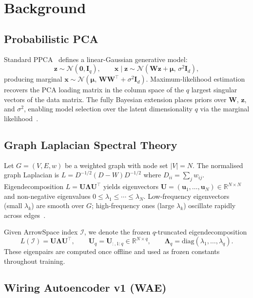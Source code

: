 \documentclass[11pt,a4paper]{article}
\newcommand{\R}{\mathbb{R}}
\newcommand{\N}{\mathcal{N}}
\newcommand{\I}{\mathcal{I}}
\newcommand{\diag}{\mathrm{diag}}
\newcommand{\bLambda}{\bm{\Lambda}}
\newcommand{\bU}{\bm{U}}
\newcommand{\bW}{\bm{W}}
\newcommand{\bz}{\bm{z}}
\newcommand{\bmu}{\bm{\mu}}
\newcommand{\bx}{\bm{x}}
\begin{document}
\section{Background}
\label{sec:background}

\subsection{Probabilistic PCA}

Standard PPCA~\citep{tipping1999ppca} defines a linear-Gaussian generative model:
\begin{equation}
  \bz \sim \N(\mathbf{0}, \bm{I}_q), \qquad
  \bx \mid \bz \sim \N(\bW\bz + \bmu,\, \sigma^2 \bm{I}_d),
  \label{eq:ppca}
\end{equation}
producing marginal $\bx\sim\N(\bmu,\,\bW\bW^\top+\sigma^2\bm{I}_d)$.
Maximum-likelihood estimation recovers the PCA loading matrix in the column
space of the $q$ largest singular vectors of the data matrix.  The fully
Bayesian extension places priors over $\bW$, $\bz$, and $\sigma^2$, enabling
model selection over the latent dimensionality $q$ via the marginal
likelihood~\citep{minka2001pca}.

\subsection{Graph Laplacian Spectral Theory}

Let $G=(V,E,w)$ be a weighted graph with node set $|V|=N$.  The normalised
graph Laplacian is $L = D^{-1/2}(D-W)D^{-1/2}$ where $D_{ii}=\sum_j w_{ij}$.
Eigendecomposition $L = \bU\bLambda\bU^\top$ yields eigenvectors
$\bU=(\mathbf{u}_1,\dots,\mathbf{u}_N)\in\R^{N\times N}$ and non-negative
eigenvalues $0\le\lambda_1\le\cdots\le\lambda_N$.  Low-frequency eigenvectors
(small $\lambda_k$) are smooth over $G$; high-frequency ones (large $\lambda_k$)
oscillate rapidly across edges~\citep{chung1997spectral}.

Given ArrowSpace index $\I$, we denote the frozen $q$-truncated eigendecomposition
\begin{equation}
  L(\I) = \bU\bLambda\bU^\top,
  \qquad
  \bU_q = \bU_{:,1:q}\in\R^{N\times q},
  \qquad
  \bLambda_q = \diag(\lambda_1,\dots,\lambda_q).
  \label{eq:eig}
\end{equation}
These eigenpairs are computed once offline and used as frozen constants
throughout training.

\subsection{Wiring Autoencoder v1 (WAE)}
\label{sec:wae_v1}
\end{document}
